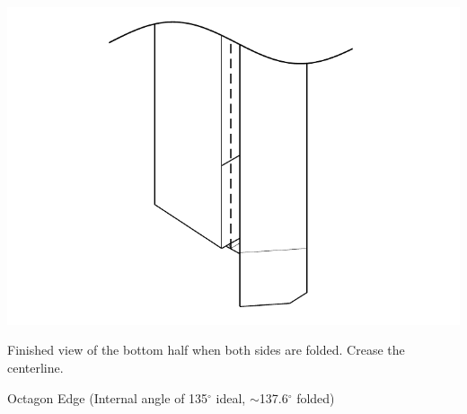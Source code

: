 \documentclass[11pt]{article}
\begin{document}
\vspace*{0.5in}

\begin{minipage}[t]{0.45\textwidth}
  \includegraphics[width=\textwidth]{../figs/fig06-08}
  \begin{itemize}{\item[8.] Finished view of the bottom half when both sides are folded.  Crease the centerline.}\end{itemize}
\end{minipage}

\newpage
{\Large Octagon Edge} (Internal angle of 135$^\circ$ ideal, $\sim$137.6$^\circ$ folded)
\vspace*{0.25in}
\end{document}
